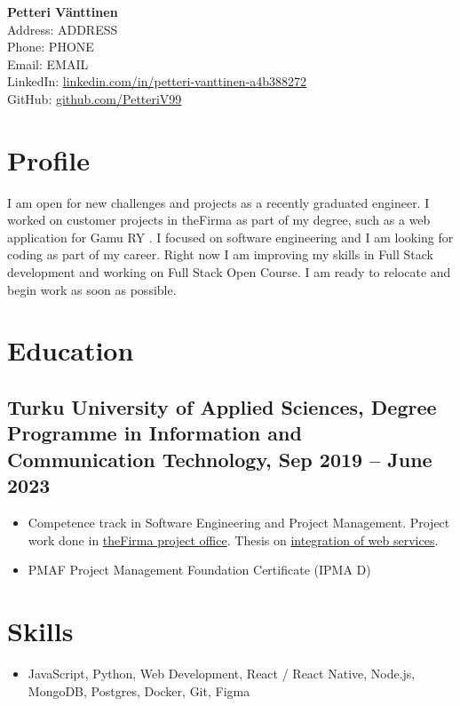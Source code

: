 \documentclass[a4paper,10pt]{article}
\begin{document}
\pagestyle{empty}

\begin{center}
    \textbf{\LARGE Petteri Vänttinen} \\
    Address: ADDRESS \\
    Phone: PHONE \\
    Email: EMAIL \\
    LinkedIn: \href{https://www.linkedin.com/in/petteri-vanttinen-a4b388272/}{linkedin.com/in/petteri-vanttinen-a4b388272} \\
    GitHub: \href{https://github.com/PetteriV99}{github.com/PetteriV99}
\end{center}

\section*{Profile}

I am open for new challenges and projects as a recently graduated engineer. I worked on customer projects in theFirma as part of my degree, such as a web application for Gamu RY . I focused on software engineering and I am looking for coding as part of my career. Right now I am improving my skills in Full Stack development and working on Full Stack Open Course. I am ready to relocate and begin work as soon as possible.

\section*{Education}
\subsection*{\textbf{Turku University of Applied Sciences}, Degree Programme in Information and Communication Technology, Sep 2019 -- June 2023}
\begin{itemize}
    \item Competence track in Software Engineering and Project Management. Project work done in \href{https://www.turkuamk.fi/fi/artikkelit/3090/thefirma-tarjoaa-palveluita-asiakkaille-ja-mahdollisuuksia-opiskelijoille/}{theFirma project office}. Thesis on \href{https://www.theseus.fi/handle/10024/803366}{integration of web services}.
    \item PMAF Project Management Foundation Certificate (IPMA D)
\end{itemize}

\section*{Skills}
\begin{itemize}
    \item JavaScript, Python, Web Development, React / React Native, Node.js, MongoDB, Postgres, Docker, Git, Figma
\end{itemize}
\end{document}
